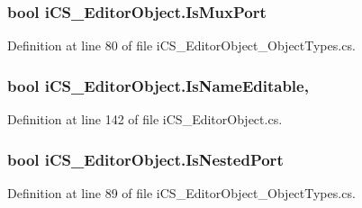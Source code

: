 \hypertarget{classi_c_s___editor_object_abd6a963f4c9ae7728d4cd16b61360ace}{
\subsubsection[{Is\+Mux\+Port}]{\setlength{\rightskip}{0pt plus 5cm}bool i\+C\+S\+\_\+\+Editor\+Object.\+Is\+Mux\+Port\hspace{0.3cm}{\ttfamily [get]}}}\label{classi_c_s___editor_object_abd6a963f4c9ae7728d4cd16b61360ace}


Definition at line 80 of file i\+C\+S\+\_\+\+Editor\+Object\+\_\+\+Object\+Types.\+cs.

\hypertarget{classi_c_s___editor_object_afd857ab309e4116f03ea6b9c0a5db497}{
\subsubsection[{Is\+Name\+Editable}]{\setlength{\rightskip}{0pt plus 5cm}bool i\+C\+S\+\_\+\+Editor\+Object.\+Is\+Name\+Editable\hspace{0.3cm}{\ttfamily [get]}, {\ttfamily [set]}}}\label{classi_c_s___editor_object_afd857ab309e4116f03ea6b9c0a5db497}


Definition at line 142 of file i\+C\+S\+\_\+\+Editor\+Object.\+cs.

\hypertarget{classi_c_s___editor_object_ad8423e67718b5f42844dabe6231e5b4e}{
\subsubsection[{Is\+Nested\+Port}]{\setlength{\rightskip}{0pt plus 5cm}bool i\+C\+S\+\_\+\+Editor\+Object.\+Is\+Nested\+Port\hspace{0.3cm}{\ttfamily [get]}}}\label{classi_c_s___editor_object_ad8423e67718b5f42844dabe6231e5b4e}


Definition at line 89 of file i\+C\+S\+\_\+\+Editor\+Object\+\_\+\+Object\+Types.\+cs.

